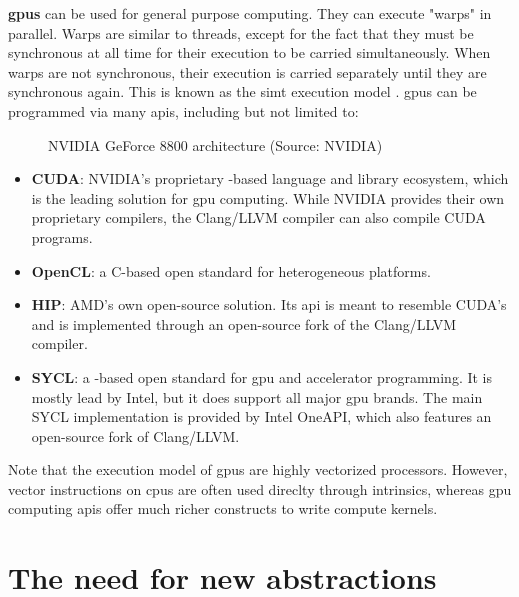 \documentclass[main]{subfiles}
\begin{document}

\textbf{\glspl{gpu}} can be used for general purpose
computing. They can execute "warps" in parallel. Warps are similar to threads,
except for the fact that they must be synchronous at all time for their
execution to be carried simultaneously. When warps are not synchronous,
their execution is carried separately until they are synchronous again.
This is known as the \gls{simt} execution model \cite{nvidia-tesla}.
\glspl{gpu} can be programmed via many \glspl{api},
including but not limited to:

\begin{figure}[h]
\fontsize{8}{10}\selectfont

\caption{NVIDIA GeForce 8800 architecture (Source: NVIDIA)}
\label{fig:nvidia-fermi}
\end{figure}

\begin{itemize}
\item
\textbf{CUDA}: NVIDIA's proprietary \cpp-based language and library
ecosystem, which is the leading solution for \gls{gpu} computing.
While NVIDIA provides their own proprietary compilers, the Clang/LLVM
compiler can also compile CUDA programs.

\item
\textbf{OpenCL}: a C-based open standard for heterogeneous platforms.

\item
\textbf{HIP}: AMD's own open-source solution. Its \gls{api} is meant to
resemble CUDA's and is implemented through an open-source fork of the
Clang/LLVM compiler.

\item
\textbf{SYCL}: a \cpp-based open standard for \gls{gpu} and
accelerator programming. It is mostly lead by Intel, but it does support
all major \gls{gpu} brands. The main SYCL implementation is provided by
Intel OneAPI, which also features an open-source fork of Clang/LLVM.

\end{itemize}
Note that the execution model of \glspl{gpu} are highly vectorized processors.
However, vector instructions on \glspl{cpu} are often used direclty through
intrinsics, whereas \gls{gpu} computing \glspl{api} offer much richer constructs
to write compute kernels.

\section{
  The need for new abstractions
}
\end{document}
